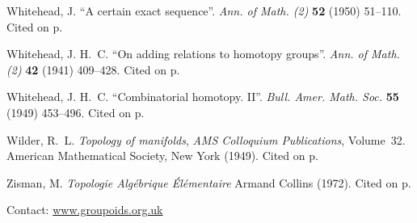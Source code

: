 \documentclass{elsarticle}
\begin{document}
\begin{thebibliography}{MLW50}
Whitehead, J.
\newblock \enquote{A certain exact sequence}.
\newblock \emph{Ann. of Math. (2)} \textbf{52} (1950) 51--110.  Cited on p.

Whitehead, J. H.~C.
\newblock \enquote{On adding relations to homotopy groups}.
\newblock \emph{Ann. of Math. (2)} \textbf{42} (1941) 409--428. Cited on p.

Whitehead, J. H.~C.
\newblock \enquote{Combinatorial homotopy. {II}}.
\newblock \emph{Bull. Amer. Math. Soc.} \textbf{55} (1949) 453--496.  Cited on p.

{W}ilder, R.~L.
\newblock \emph{Topology of manifolds}, \emph{AMS Colloquium Publications},
  Volume~32.
\newblock American Mathematical Society, {New York} (1949). Cited on p.


Zisman, M.
\newblock \emph{Topologie Alg\'ebrique \'El\'ementaire} Armand Collins (1972).  Cited on p.

\end{thebibliography}
Contact: \url{www.groupoids.org.uk}
\end{document}
